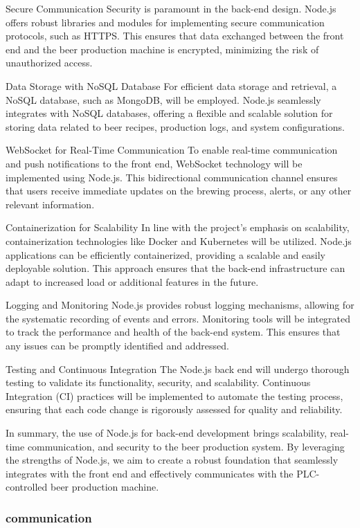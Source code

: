 Secure Communication
Security is paramount in the back-end design. Node.js offers robust libraries and modules for implementing secure communication protocols, such as HTTPS. This ensures that data exchanged between the front end and the beer production machine is encrypted, minimizing the risk of unauthorized access.

Data Storage with NoSQL Database
For efficient data storage and retrieval, a NoSQL database, such as MongoDB, will be employed. Node.js seamlessly integrates with NoSQL databases, offering a flexible and scalable solution for storing data related to beer recipes, production logs, and system configurations.

WebSocket for Real-Time Communication
To enable real-time communication and push notifications to the front end, WebSocket technology will be implemented using Node.js. This bidirectional communication channel ensures that users receive immediate updates on the brewing process, alerts, or any other relevant information.

Containerization for Scalability
In line with the project's emphasis on scalability, containerization technologies like Docker and Kubernetes will be utilized. Node.js applications can be efficiently containerized, providing a scalable and easily deployable solution. This approach ensures that the back-end infrastructure can adapt to increased load or additional features in the future.

Logging and Monitoring
Node.js provides robust logging mechanisms, allowing for the systematic recording of events and errors. Monitoring tools will be integrated to track the performance and health of the back-end system. This ensures that any issues can be promptly identified and addressed.

Testing and Continuous Integration
The Node.js back end will undergo thorough testing to validate its functionality, security, and scalability. Continuous Integration (CI) practices will be implemented to automate the testing process, ensuring that each code change is rigorously assessed for quality and reliability.

In summary, the use of Node.js for back-end development brings scalability, real-time communication, and security to the beer production system. By leveraging the strengths of Node.js, we aim to create a robust foundation that seamlessly integrates with the front end and effectively communicates with the PLC-controlled beer production machine.

\subsubsection{communication}

